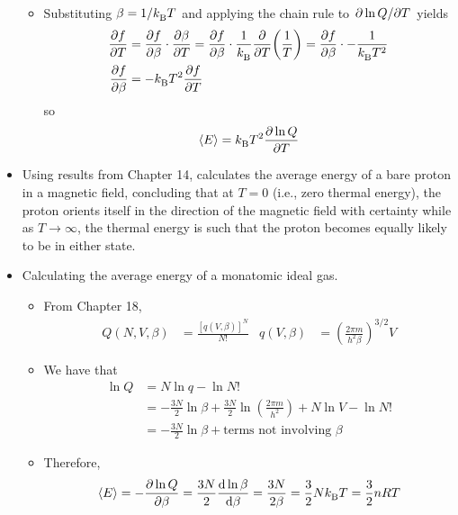 \documentclass[../notes.tex]{subfiles}
\begin{document}
\begin{itemize}
\begin{itemize}
\begin{align*}
        \end{align*}
        \item Substituting $\beta=1/{k_\text{B}^{}} T$ and applying the chain rule to $\pdv*{\ln Q}{T}$ yields
        \begin{align*}
            \pdv{f}{T} &= \pdv{f}{\beta}\cdot\pdv{\beta}{T}
            = \pdv{f}{\beta}\cdot\frac{1}{{k_\text{B}^{}}}\pdv{T}(\frac{1}{T})
            = \pdv{f}{\beta}\cdot-\frac{1}{{k_\text{B}^{}} T^2}\\
            \pdv{f}{\beta} &= -{k_\text{B}^{}} T^2\pdv{f}{T}
        \end{align*}
        so
        \begin{equation*}
            \left\langle{E}\right\rangle = {k_\text{B}^{}} T^2\pdv{\ln Q}{T}
        \end{equation*}
    \end{itemize}
    \item Using results from Chapter 14, \textcite{bib:McQuarrieSimon} calculates the average energy of a bare proton in a magnetic field, concluding that at $T=0$ (i.e., zero thermal energy), the proton orients itself in the direction of the magnetic field with certainty while as $T\to\infty$, the thermal energy is such that the proton becomes equally likely to be in either state.
    \item Calculating the average energy of a monatomic ideal gas.
    \begin{itemize}
        \item From Chapter 18,
        \begin{align*}
            Q(N,V,\beta) &= \frac{[q(V,\beta)]^N}{N!}&
            q(V,\beta) &= \left( \frac{2\pi m}{h^2\beta} \right)^{3/2}V
        \end{align*}
        \item We have that
        \begin{align*}
            \ln Q &= N\ln q-\ln N!\\
            &= -\frac{3N}{2}\ln\beta+\frac{3N}{2}\ln\left( \frac{2\pi m}{h^2} \right)+N\ln V-\ln N!\\
            &= -\frac{3N}{2}\ln\beta+\text{terms not involving }\beta
        \end{align*}
        \item Therefore,
        \begin{equation*}
            \left\langle{E}\right\rangle = -\pdv{\ln Q}{\beta} = \frac{3N}{2}\dv{\ln\beta}{\beta} = \frac{3N}{2\beta} = \frac{3}{2}N{k_\text{B}^{}} T = \frac{3}{2}nRT
        \end{equation*}
    \end{itemize}

\end{itemize}
\end{document}
